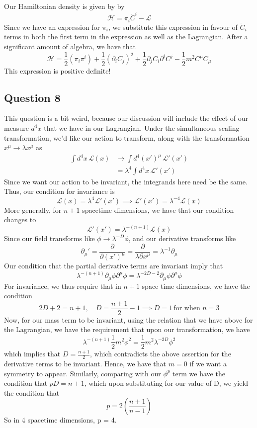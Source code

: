 \documentclass[11pt, oneside]{article}   	%
\theoremstyle{newline}
\theoremstyle{newline}
\theoremstyle{newline}
\theoremstyle{newline}
\theoremstyle{newline}
\begin{document}
Our Hamiltonian density is given by by 
\[ 
\mathcal{H}  = \pi_i \dot{C}^i - \mathcal{L} 
\] 
Since we have an expression for $\pi_i$, we substitute this expression in favour of $\dot{ C}_i$ terms in both the first term in the expression as well as the Lagrangian. After a significant amount of algebra, we have that\[ 
\mathcal{H} = \frac{1}{2} (\pi_i \pi^i ) + \frac{1}{2} (\partial_i C_j)^2 + \frac{1}{2} \partial_j C_i \partial^i C^j - \frac{ 1}{ 2} m^2 C^\mu C_\mu 
\] 
This expression is positive definite!  
\pagebreak 

\subsection{Question 8} 
This question is a bit weird, because our discussion will include the effect of our measure $d^4 x $ that we have in our Lagrangian. Under the simultaneous scaling transformation, we'd like our action to transform, along with the transformation $x^\mu \rightarrow \lambda x^\mu$ as 
\begin{align*}
\int d^4 x \, \mathcal{L} (x) & \rightarrow \int d^4 (x')^\mu  \,  \mathcal{L }'(x' ) \\ 
&= \lambda^4 \int d^4 x \,   \mathcal{L}' (x' ) 
\end{align*} 
Since we want our action to be invariant, the integrands here need be the same.
Thus, our condition for invariance is 
\[ 
\mathcal{L} (x)  = \lambda^4 \mathcal{L}'( x') \implies \mathcal{L}'(x ' )  = \lambda^{ -4} \mathcal{L} (x) 
\] 
More generally, for $n + 1$ spacetime dimensions, we have that our condition changes to 
\[ 
\mathcal{L}' (x ' ) = \lambda^{ -(n + 1)  } \mathcal{ L } (x)
\] 
Since our field transforms like $\phi \rightarrow \lambda^{ -D } \phi$, and our derivative transforms like
\[ 
\partial_\mu '  = \frac{ \partial }{ \partial( x' )^\mu} = \frac{ \partial}{ \lambda \partial x^\mu } = \lambda^{ -1} \partial_\mu \] 
Our condition that the partial derivative terms are invariant imply that 
\[
\lambda^{ -( n + 1)} \partial_\mu \phi \partial^\mu \phi = \lambda^{ - 2D - 2} \partial_\mu \phi \partial^\mu \phi 
\]      
For invariance, we thus require that in $n + 1$ space time dimensions, we have the condition\[ 
2D + 2 = n + 1, \quad D = \frac{ n + 1}{2}  -1  \implies D = 1 \,  \text{for when } n = 3 
\] 
Now, for our mass term to be invariant, using the relation that we have above for the Lagrangian, we have the requirement that upon our transformation, we have \[
\lambda^{  - (n + 1 ) } \frac{1}{2}m^2 \phi^2  = \frac{1}{2} m^2 \lambda^{ - 2D} \phi^2 
\] which implies that $D = \frac{ n + 1}{ 2} $, which contradicts the above assertion for the derivative terms to be invariant. Hence, we have that $m = 0$ if we want a symmetry to appear. Similarly, comparing with our $\phi^p$ term we have the condition that $pD  =  n + 1 $, which upon substituting for our value of D, we yield the condition that 
\[ 
p = 2 \left( \frac{ n + 1}{ n - 1 }  \right) 
\] 
So in 4 spacetime dimensions, p = 4. 
\end{document}
